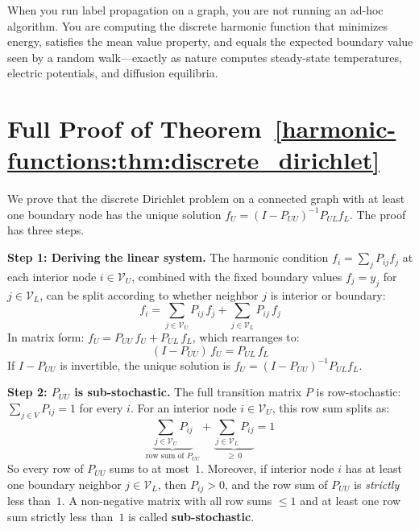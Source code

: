 \begin{notechapter}
When you run label propagation on a graph, you are not running an ad-hoc
algorithm. You are computing the discrete harmonic function that minimizes
energy, satisfies the mean value property, and equals the expected boundary
value seen by a random walk---exactly as nature computes steady-state
temperatures, electric potentials, and diffusion equilibria.


\newpage
\chapterappendix

\section{Full Proof of Theorem~\ref{harmonic-functions:thm:discrete_dirichlet}}
\label{harmonic-functions:app:proof_dirichlet}

We prove that the discrete Dirichlet problem on a connected graph with at
least one boundary node has the unique solution
$f_U = (I - P_{UU})^{-1}P_{UL}f_L$. The proof has three steps.

\textbf{Step 1: Deriving the linear system.} The harmonic condition
$f_i = \sum_j P_{ij}f_j$ at each interior node $i \in \mathcal{V}_U$,
combined with the fixed boundary values $f_j = y_j$ for
$j \in \mathcal{V}_L$, can be split according to whether neighbor $j$ is
interior or boundary:
\[
f_i = \sum_{j \in \mathcal{V}_U} P_{ij}\,f_j
    + \sum_{j \in \mathcal{V}_L} P_{ij}\,f_j
\]
In matrix form: $f_U = P_{UU}\,f_U + P_{UL}\,f_L$, which rearranges to:
\begin{equation}
\label{harmonic-functions:eq:app_linear_system}
(I - P_{UU})\,f_U = P_{UL}\,f_L
\end{equation}
If $I - P_{UU}$ is invertible, the unique solution is
$f_U = (I - P_{UU})^{-1}P_{UL}f_L$.

\textbf{Step 2: $P_{UU}$ is sub-stochastic.} The full transition matrix $P$
is row-stochastic: $\sum_{j \in V} P_{ij} = 1$ for every $i$. For an
interior node $i \in \mathcal{V}_U$, this row sum splits as:
\[
\underbrace{\sum_{j \in \mathcal{V}_U} P_{ij}}_{\text{row sum of }P_{UU}}
+ \underbrace{\sum_{j \in \mathcal{V}_L} P_{ij}}_{\geq\, 0} = 1
\]
So every row of $P_{UU}$ sums to at most~$1$. Moreover, if interior node
$i$ has at least one boundary neighbor $j \in \mathcal{V}_L$, then
$P_{ij} > 0$, and the row sum of $P_{UU}$ is \emph{strictly} less than~$1$.
A non-negative matrix with all row sums $\leq 1$ and at least one row sum
strictly less than~$1$ is called \textbf{sub-stochastic}.


\end{notechapter}
